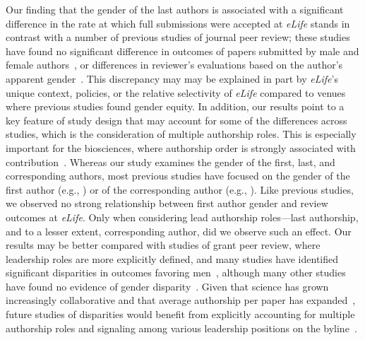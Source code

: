 \documentclass[10pt,letterpaper]{article}
\begin{document}
Our finding that the gender of the last authors is associated with a significant difference in the rate at which full submissions were accepted at \textit{eLife} stands in contrast with a number of previous studies of journal peer review; these studies have found no significant difference in outcomes of papers submitted by male and female authors~\cite{tomkins_reviewer_2017, valkonen_gender_2011, fox_editor_2015}, or differences in reviewer’s evaluations based on the author’s apparent gender~\cite{borsuk_name_2009}. This discrepancy may may be explained in part by \textit{eLife}’s unique context, policies, or the relative selectivity of \textit{eLife} compared to venues where previous studies found gender equity. In addition, our results point to a key feature of study design that may account for some of the differences across studies, which is the consideration of multiple authorship roles. This is especially important for the biosciences, where authorship order is strongly associated with contribution~\cite{baerlocher_meaning_2007, kassis_how_2017, tscharntke_author_2007}. Whereas our study examines the gender of the first, last, and corresponding authors, most previous studies have focused on the gender of the first author (e.g., \cite{walker_personal_2015, tregenza_gender_2002, valkonen_gender_2011}) or of the corresponding author (e.g., \cite{noauthor_women_2006, gilbert_is_1994}). Like previous studies, we observed no strong relationship between first author gender and review outcomes at \textit{eLife}. Only when considering lead authorship roles—last authorship, and to a lesser extent, corresponding author, did we observe such an effect. Our results may be better compared with studies of grant peer review, where leadership roles are more explicitly defined, and many studies have identified significant disparities in outcomes favoring men~\cite{li_gender_2011, bedi_gender_2012, gannon_searching_2001, lee_gender_2015, shen_inequality_2013, tamblyn_assessment_2018}, although many other studies have found no evidence of gender disparity~\cite{beck_gender_2017, mutz_does_2012, pohlhaus_sex_2011, waisbren_gender_2008, grant_no_1997, marsh_gender_2011}. Given that science has grown increasingly collaborative and that average authorship per paper has expanded~\cite{lariviere_team_2014, wuchty_increasing_2007}, future studies of disparities would benefit from explicitly accounting for multiple authorship roles and signaling among various leadership positions on the byline~\cite{costas_age_2011, lariviere_contributorship_2016}. 
\end{document}
